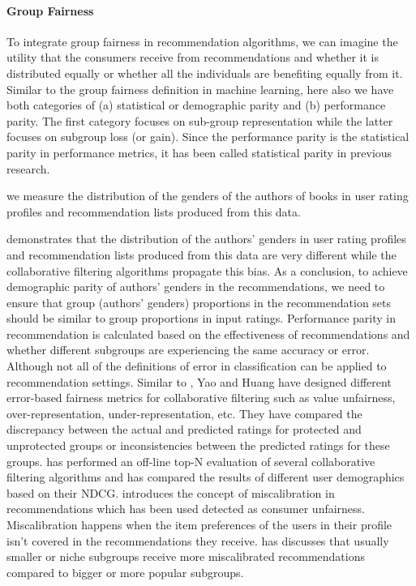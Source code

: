\paragraph{Group Fairness}
To integrate group fairness in recommendation algorithms, we can imagine the utility that the consumers receive from recommendations and whether it is distributed equally or whether all the individuals are benefiting equally from it. Similar to the group fairness definition in machine learning, here also we have both categories of (a) statistical or demographic parity and (b) performance parity. The first category focuses on sub-group representation while the latter focuses on subgroup loss (or gain). Since the performance parity is the statistical parity in performance metrics, it has been called statistical parity in previous research.

we measure the distribution of the genders of the authors of books in user rating profiles and recommendation lists produced from this data.

\cite{ekstrand2018exploring} demonstrates that the distribution of the authors' genders in user rating profiles and recommendation lists produced from this data are very different while the collaborative filtering algorithms propagate this bias. As a conclusion, to achieve demographic parity of authors' genders in the recommendations, we need to ensure that group (authors' genders) proportions in the recommendation sets should be similar to group proportions in input ratings. 
Performance parity in recommendation is calculated based on the effectiveness of recommendations and whether different subgroups are experiencing the same accuracy or error. Although not all of the definitions of error in classification can be applied to recommendation settings. Similar to \cite{kamishima2016model}, Yao and Huang \cite{yao_huang_fatml-2017} have designed different error-based fairness metrics for collaborative filtering such as value unfairness, over-representation, under-representation, etc. They have compared the discrepancy between the actual and predicted ratings for protected and unprotected groups or inconsistencies between the predicted ratings for these groups. 
\cite{ekstrand2018all} has performed an off-line top-N evaluation of several collaborative filtering algorithms and has compared the results of different user demographics based on their NDCG.
\cite{steck2018calibrated} introduces the concept of miscalibration in recommendations which has been used detected as consumer unfairness. Miscalibration happens when the item preferences of the users in their profile isn't covered in the recommendations they receive. \cite{Kun2020calib} has discusses that usually smaller or niche subgroups receive more miscalibrated recommendations compared to bigger or more popular subgroups.
        
